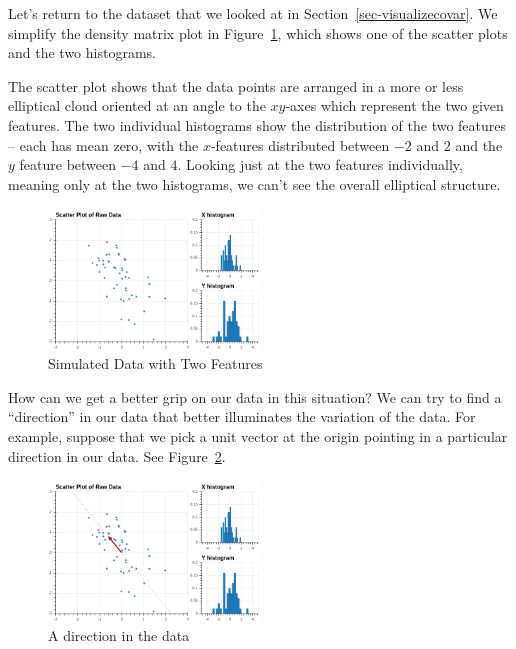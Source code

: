 \documentclass[
  11pt,
  letterpaper,
]{scrbook}
\theoremstyle{plain}
\theoremstyle{plain}
\theoremstyle{remark}
\begin{document}
Let's return to the dataset that we looked at in
Section~\ref{sec-visualizecovar}. We simplify the density matrix plot in
Figure~\ref{fig-pcasimfig}, which shows one of the scatter plots and the
two histograms.

The scatter plot shows that the data points are arranged in a more or
less elliptical cloud oriented at an angle to the \(xy\)-axes which
represent the two given features. The two individual histograms show the
distribution of the two features -- each has mean zero, with the
\(x\)-features distributed between \(-2\) and \(2\) and the \(y\)
feature between \(-4\) and \(4\). Looking just at the two features
individually, meaning only at the two histograms, we can't see the
overall elliptical structure.

\begin{figure}

{\centering \includegraphics[width=0.5\textwidth,height=\textheight]{chapters/img/PCAsimulated-1.png}

}

\caption{\label{fig-pcasimfig}Simulated Data with Two Features}

\end{figure}

How can we get a better grip on our data in this situation? We can try
to find a ``direction'' in our data that better illuminates the
variation of the data. For example, suppose that we pick a unit vector
at the origin pointing in a particular direction in our data. See
Figure~\ref{fig-pcasimfig-1}.

\begin{figure}

{\centering \includegraphics[width=0.5\textwidth,height=\textheight]{chapters/img/PCAsimulated-2.png}

}

\caption{\label{fig-pcasimfig-1}A direction in the data}

\end{figure}
\end{document}
